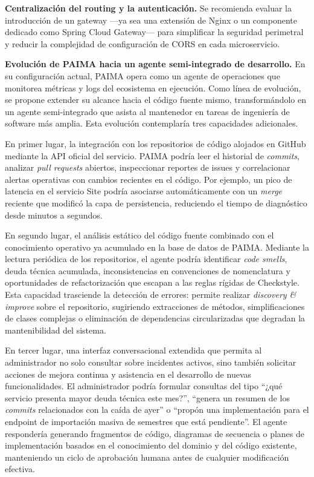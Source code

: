 \textbf{Centralización del routing y la autenticación.} Se recomienda evaluar la
introducción de un gateway ---ya sea una extensión de Nginx o un componente
dedicado como Spring Cloud Gateway--- para simplificar la seguridad perimetral y
reducir la complejidad de configuración de CORS en cada microservicio.

\textbf{Evolución de PAIMA hacia un agente semi-integrado de desarrollo.} En su
configuración actual, PAIMA opera como un agente de operaciones que monitorea
métricas y logs del ecosistema en ejecución. Como línea de evolución, se propone
extender su alcance hacia el código fuente mismo, transformándolo en un agente
semi-integrado que asista al mantenedor en tareas de ingeniería de software más
amplia. Esta evolución contemplaría tres capacidades adicionales.

En primer lugar, la integración con los repositorios de código alojados en GitHub
mediante la API oficial del servicio. PAIMA podría leer el historial de
\textit{commits}, analizar \textit{pull requests} abiertos, inspeccionar reportes de
issues y correlacionar alertas operativas con cambios recientes en el código. Por
ejemplo, un pico de latencia en el servicio Site podría asociarse automáticamente
con un \textit{merge} reciente que modificó la capa de persistencia, reduciendo el
tiempo de diagnóstico desde minutos a segundos.

En segundo lugar, el análisis estático del código fuente combinado con el
conocimiento operativo ya acumulado en la base de datos de PAIMA. Mediante la
lectura periódica de los repositorios, el agente podría identificar \textit{code
smells}, deuda técnica acumulada, inconsistencias en convenciones de nomenclatura
y oportunidades de refactorización que escapan a las reglas rígidas de Checkstyle.
Esta capacidad trasciende la detección de errores: permite realizar \textit{discovery
\& improve} sobre el repositorio, sugiriendo extracciones de métodos,
simplificaciones de clases complejas o eliminación de dependencias circularizadas
que degradan la mantenibilidad del sistema.

En tercer lugar, una interfaz conversacional extendida que permita al
administrador no solo consultar sobre incidentes activos, sino también solicitar
acciones de mejora continua y asistencia en el desarrollo de nuevas
funcionalidades. El administrador podría formular consultas del tipo ``¿qué
servicio presenta mayor deuda técnica este mes?'', ``genera un resumen de los
\textit{commits} relacionados con la caída de ayer'' o ``propón una
implementación para el endpoint de importación masiva de semestres que está
pendiente''. El agente respondería generando fragmentos de código, diagramas de
secuencia o planes de implementación basados en el conocimiento del dominio y del
código existente, manteniendo un ciclo de aprobación humana antes de
cualquier modificación efectiva.

